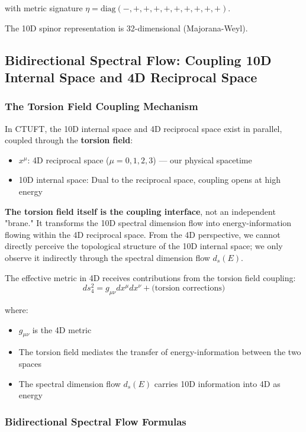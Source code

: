 with metric signature $\eta = \text{diag}(-,+,+,+,+,+,+,+,+,+)$.

The 10D spinor representation is 32-dimensional (Majorana-Weyl).

\subsection{Bidirectional Spectral Flow: Coupling 10D Internal Space and 4D Reciprocal Space}

\subsubsection{The Torsion Field Coupling Mechanism}

In CTUFT, the 10D internal space and 4D reciprocal space exist in parallel, coupled through the \textbf{torsion field}:
\begin{itemize}
    \item $x^\mu$: 4D reciprocal space ($\mu = 0,1,2,3$) — our physical spacetime
    \item 10D internal space: Dual to the reciprocal space, coupling opens at high energy
\end{itemize}

\textbf{The torsion field itself is the coupling interface}, not an independent "brane." It transforms the 10D spectral dimension flow into energy-information flowing within the 4D reciprocal space. From the 4D perspective, we cannot directly perceive the topological structure of the 10D internal space; we only observe it indirectly through the spectral dimension flow $d_s(E)$.

The effective metric in 4D receives contributions from the torsion field coupling:
\begin{equation}
    ds_{4}^2 = g_{\mu\nu}dx^\mu dx^\nu + \text{(torsion corrections)}
\end{equation}

where:
\begin{itemize}
    \item $g_{\mu\nu}$ is the 4D metric
    \item The torsion field mediates the transfer of energy-information between the two spaces
    \item The spectral dimension flow $d_s(E)$ carries 10D information into 4D as energy
\end{itemize}

\subsubsection{Bidirectional Spectral Flow Formulas}

